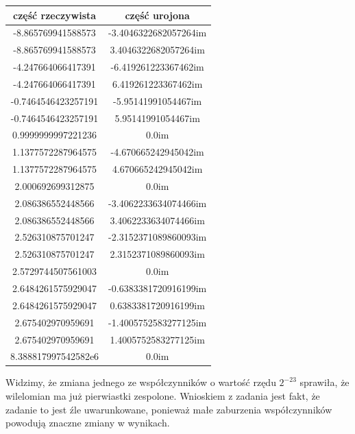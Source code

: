 \documentclass[]{article}
\begin{document}
	\begin{table}[h!]
		\centering
		\label{tab:table1}
		\begin{tabular}{|c|c|}
			\hline
			część rzeczywista & część urojona \\
			\hline
			-8.865769941588573 & -3.4046322682057264im \\ \hline
			-8.865769941588573 & 3.4046322682057264im \\ \hline
			-4.247664066417391 & -6.419261223367462im \\ \hline
			-4.247664066417391 & 6.419261223367462im \\ \hline
			-0.7464546423257191 & -5.95141991054467im \\ \hline
			-0.7464546423257191 & 5.95141991054467im \\ \hline
			0.9999999997221236 & 0.0im \\ \hline
			1.1377572287964575 & -4.670665242945042im \\ \hline
			1.1377572287964575 & 4.670665242945042im \\ \hline
			2.000692699312875 & 0.0im \\ \hline
			2.086386552448566 & -3.4062233634074466im \\ \hline
			2.086386552448566 & 3.4062233634074466im \\ \hline
			2.526310875701247 & -2.3152371089860093im \\ \hline
			2.526310875701247 & 2.3152371089860093im \\ \hline
			2.5729744507561003 & 0.0im \\ \hline
			2.6484261575929047 & -0.6383381720916199im \\ \hline
			2.6484261575929047 & 0.6383381720916199im \\ \hline
			2.675402970959691 & -1.4005752583277125im \\ \hline
			2.675402970959691 & 1.4005752583277125im \\ \hline
			8.388817997542582e6 & 0.0im \\ \hline
		\end{tabular}
	\end{table}
	
	Widzimy, że zmiana jednego ze współczynników o wartość rzędu $2^{-23}$ sprawiła, że wilelomian ma już pierwiastki zespolone. Wnioskiem z zadania jest fakt, że zadanie to jest źle uwarunkowane, ponieważ małe zaburzenia współczynników powodują znaczne zmiany w wynikach.
	
	\clearpage
	
\end{document}
